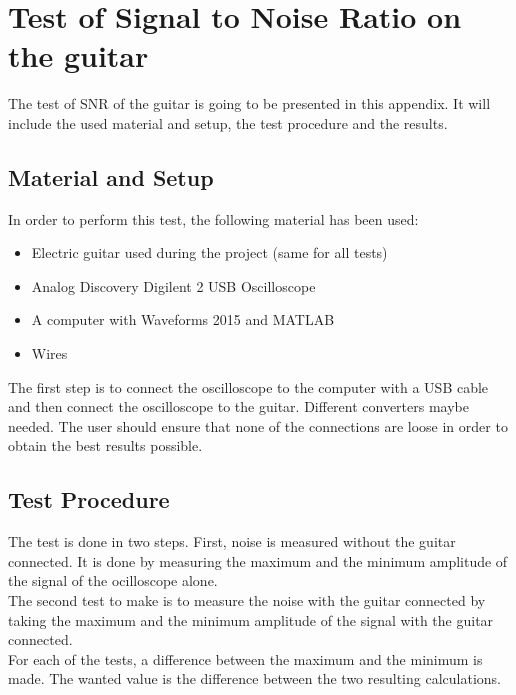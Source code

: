 \chapter{Test of Signal to Noise Ratio on the guitar}\label{app:test:snr}

The test of SNR of the guitar is going to be presented in this appendix. It will include the used material and setup, the test procedure and the results. \\

\section{Material and Setup}

In order to perform this test, the following material has been used:

\begin{itemize}
	\item Electric guitar used during the project (same for all tests)
	\item Analog Discovery Digilent 2 USB Oscilloscope
	\item A computer with Waveforms 2015 and MATLAB
	\item Wires
\end{itemize}


The first step is to connect the oscilloscope to the computer with a USB cable and then connect the oscilloscope to the guitar. Different converters maybe needed. The user should ensure that none of the connections are loose in order to obtain the best results possible. \\

\section{Test Procedure}

The test is done in two steps. First, noise is measured without the guitar connected. It is done by measuring the maximum and the minimum amplitude of the signal of the ocilloscope alone. \\

The second test to make is to measure the noise with the guitar connected by taking the maximum and the minimum amplitude of the signal with the guitar connected.  \\

For each of the tests, a difference between the maximum and the minimum is made. The wanted value is the difference between the two resulting calculations. \\

